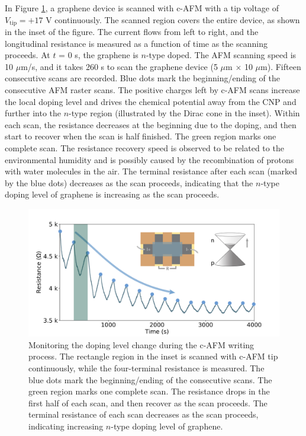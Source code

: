 \documentclass[pdflatex, sectionletters, 12pt]{pittetd}    %
\begin{document}
In Figure \ref{FIG:WritingResistance}, a graphene device is scanned with c-AFM with a tip voltage of $V_\mathrm{tip} = +17$ V continuously. The scanned region covers the entire device, as shown in the inset of the figure. The current flows from left to right, and the longitudinal resistance is measured as a function of time as the scanning proceeds. At $t$ = 0 s, the graphene is $n$-type doped. The AFM scanning speed is 10 $\mu$m/s, and it takes 260 s to scan the graphene device (5 $\mu$m $\times$ 10 $\mu$m). Fifteen consecutive scans are recorded. Blue dots mark the beginning/ending of the consecutive AFM raster scans. The positive charges left by c-AFM scans increase the local doping level and drives the chemical potential away from the CNP and further into the $n$-type region (illustrated by the Dirac cone in the inset). Within each scan, the resistance decreases at the beginning due to the doping, and then start to recover when the scan is half finished. The green region marks one complete scan. The resistance recovery speed is observed to be related to the environmental humidity and is possibly caused by the recombination of protons with water molecules in the air. The terminal resistance after each scan (marked by the blue dots) decreases as the scan proceeds, indicating that the $n$-type doping level of graphene is increasing as the scan proceeds.
\\

\begin{figure}[h!]
	\centering
	\includegraphics[width=1\textwidth]{Drawing/WritingResistance.pdf}
	\caption{Monitoring the doping level change during the c-AFM writing process. The rectangle region in the inset is scanned with c-AFM tip continuously, while the four-terminal resistance is measured. The blue dots mark the beginning/ending of the consecutive scans. The green region marks one complete scan. The resistance drops in the first half of each scan, and then recover as the scan proceeds. The terminal resistance of each scan decreases as the scan proceeds, indicating increasing $n$-type doping level of graphene.}
	\label{FIG:WritingResistance}
\end{figure}
\end{document}

